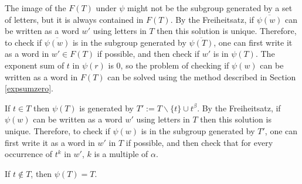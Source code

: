 \documentclass[12pt]{article} %
\theoremstyle{definition}
\theoremstyle{definition}
\theoremstyle{definition}
\theoremstyle{definition}
\newtheorem{defn}[thm]{Definition}
\begin{document}
The image of the $F(T)$ under $\psi$ might not be the
subgroup generated by a set of letters, but it is always contained in $F(T)$.
By the Freiheitsatz, if $\overline{\psi(w)}$ can be written
as a word $w'$ using letters in $T$ then this solution is unique.
Therefore, to check if $\overline{\psi(w)}$ is in the subgroup generated by
$\overline{\psi(T)}$, one can first write it as a word in $w' \in F(T)$ if possible,
and then check if $w'$ is in $\psi(T)$.
The exponent sum of $t$ in $\psi(r)$ is $0$, so the problem of checking
if $\psi(w)$ can be written as a word in $F(T)$ can be solved using
the method described in Section \ref{expsumzero}.

If $t \in T$ then $\psi(T)$ is generated by
$T' := T \backslash \{t\} \cup t^\beta$. By the Freiheitsatz, if $\psi(w)$ can be written
as a word $w'$ using letters in $T$ then this solution is unique. Therefore,
to check if $\psi(w)$ is in the subgroup generated by $T'$, one can first
write it as a word in $w'$ in $T$ if possible, and then check that for every
occurrence of $t^k$ in $w'$, $k$ is a multiple of $\alpha$.

If $t \notin T$, then  $\psi(T) = T$.






\end{document}
